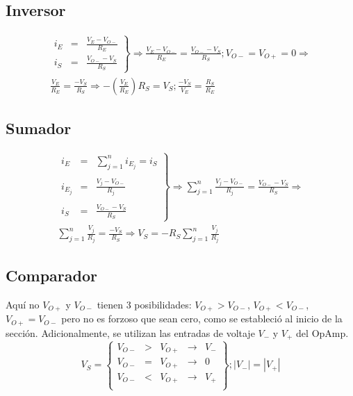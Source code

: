 \documentclass[12pt,spanish,lettersize]{report}
\begin{document}
\subsection{Inversor}
\begin{eqnarray}
\left.\begin{array}{rcl}
i_E&=&\frac{V_E-V_{O-}}{R_E}\\
i_S&=&\frac{V_{O-}-V_S}{R_S}
\end{array}\right\}\Rightarrow
\nonumber\frac{V_E-V_{O-}}{R_E} = \frac{V_{O-}-V_S}{R_S}; V_{O-}=V_{O+}=0\Rightarrow\\
\frac{V_E}{R_E} = \frac{-V_S}{R_S}\Rightarrow
-\left(\frac{V_E}{R_E}\right)R_S = V_S;
\frac{-V_S}{V_E} = \frac{R_S}{R_E}
\end{eqnarray}
\subsection{Sumador}
\begin{eqnarray}
\left.\begin{array}{rcl}
i_E&=&\sum_{j=1}^ni_{E_j} = i_S\\ \\
i_{E_j}&=&\frac{V_j-V_{O-}}{R_j}\\ \\
i_S&=&\frac{V_{O-}-V_S}{R_S}
\end{array}\right\}\Rightarrow
\sum_{j=1}^n\frac{V_j-V_{O-}}{R_j} = \frac{V_{O-}-V_S}{R_S}\Rightarrow\\
\sum_{j=1}^n\frac{V_j}{R_j} = \frac{-V_S}{R_S}\Rightarrow
V_S=-R_S\sum_{j=1}^n\frac{V_j}{R_j}
\end{eqnarray}
\subsection{Comparador}
Aqu\'i no $V_{O+}$ y $V_{O-}$ tienen 3 posibilidades: $V_{O+}>V_{O-}$, $V_{O+}<V_{O-}$, $V_{O+}=V_{O-}$ pero no es forzoso que sean cero, como se estableci\'o al inicio de la secci\'on. Adicionalmente, se utilizan las entradas de voltaje $V_-$ y $V_+$ del OpAmp.
\begin{equation}
V_S=\left\{
\begin{array}{ccccc}
V_{O-}&>&V_{O+}&\rightarrow&V_-\\
V_{O-}&=&V_{O+}&\rightarrow&0\\
V_{O-}&<&V_{O+}&\rightarrow&V_+\\
\end{array}\right\}; |V_-|=|V_+|
\end{equation}
\end{document}
